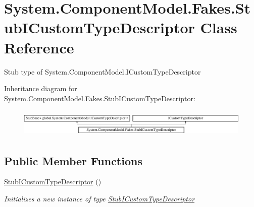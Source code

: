 \hypertarget{class_system_1_1_component_model_1_1_fakes_1_1_stub_i_custom_type_descriptor}{\section{System.\-Component\-Model.\-Fakes.\-Stub\-I\-Custom\-Type\-Descriptor Class Reference}
\label{class_system_1_1_component_model_1_1_fakes_1_1_stub_i_custom_type_descriptor}
}


Stub type of System.\-Component\-Model.\-I\-Custom\-Type\-Descriptor 


Inheritance diagram for System.\-Component\-Model.\-Fakes.\-Stub\-I\-Custom\-Type\-Descriptor\-:\begin{figure}[H]
\begin{center}
\leavevmode
\includegraphics[height=1.359223cm]{class_system_1_1_component_model_1_1_fakes_1_1_stub_i_custom_type_descriptor}
\end{center}
\end{figure}
\subsection*{Public Member Functions}
\begin{DoxyCompactItemize}
\item 
\hyperlink{class_system_1_1_component_model_1_1_fakes_1_1_stub_i_custom_type_descriptor_a4d4fd861a7831cdd54a2f4c2674eac80}{Stub\-I\-Custom\-Type\-Descriptor} ()
\begin{DoxyCompactList}\small\item\em Initializes a new instance of type \hyperlink{class_system_1_1_component_model_1_1_fakes_1_1_stub_i_custom_type_descriptor}{Stub\-I\-Custom\-Type\-Descriptor}\end{DoxyCompactList}\end{DoxyCompactItemize}
